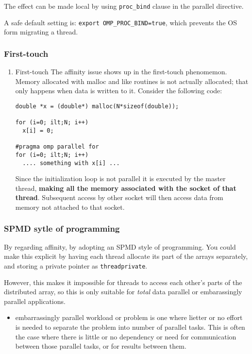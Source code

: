 \documentclass[11pt]{article}
\begin{document}
\begin{enumerate}
The effect can be made local by using \texttt{proc\_bind} clause in the parallel directive.

A safe default setting is: \verb~export OMP_PROC_BIND=true~, which prevents the OS form migrating a thread.
\end{enumerate}


\subsubsection{First-touch}
\label{sec-7-3-2}
\begin{enumerate}
\item First-touch
\label{sec-7-3-2-1}
The affinity issue shows up in the first-touch phenomemon. Memory allocated with malloc and like routines is not actually allocated; that only happens when data is written to it. Consider the following code:
\begin{verbatim}
double *x = (double*) malloc(N*sizeof(double));

for (i=0; ilt;N; i++)
  x[i] = 0;

#pragma omp parallel for
for (i=0; ilt;N; i++)
  .... something with x[i] ...
\end{verbatim}

Since the initialization loop is not parallel it is executed by the master thread, \textbf{making all the memory associated with the socket of that thread}. Subsequent access by other socket will then access data from memory not attached to that socket.
\end{enumerate}

\subsubsection{SPMD sytle of programming}
\label{sec-7-3-3}
By regarding affinity, by adopting an SPMD style of programming. You could make this explicit by having each thread allocate its part of the arrays separately, and storing a private pointer as \verb~threadprivate~. 

However, this makes it impossible for threads to access each other's parts of the distributed array, so this is only suitable for \emph{total} data  parallel or embarassingly parallel applications.

\begin{itemize}
\item embarrassingly parallel workload or problem is one where lietter or no effort is needed to separate the problem into number of parallel tasks. This is often the case where there is little or no dependency or need for communication between those parallel tasks, or for results between them.
\end{itemize}
\end{document}

